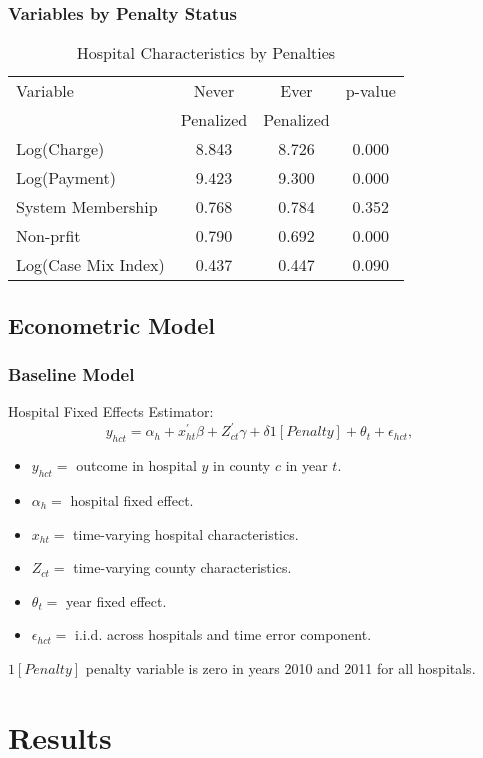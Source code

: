 \documentclass{beamer}
\begin{document}
\begin{frame}
\frametitle{Variables by Penalty Status}
\begin{table}[htp]
\centering \normalsize
\caption{Hospital Characteristics by Penalties}
\label{tab:hosp}
\begin{tabular}{lccc}
\hline \hline
Variable 	& Never 				& Ever  				& p-value  	  \\
		   		&  Penalized    		& Penalized			&       				\\
 \hline
Log(Charge) & 8.843 & 8.726 & 0.000 \\
Log(Payment) & 9.423 & 9.300 & 0.000	\\
System Membership & 0.768 & 0.784 & 0.352	\\
Non-prfit & 0.790 & 0.692 & 0.000	\\
Log(Case Mix Index) & 0.437 & 0.447 & 0.090	\\
\hline
\end{tabular}
\end{table}
\end{frame}

\subsection{Econometric Model}

\begin{frame}
\frametitle{Baseline Model}
Hospital Fixed Effects Estimator: 
\begin{equation}
\label{eq: reg}
y_{hct} = \alpha_{h} + x^{'}_{ht}\beta +  Z^{'}_{ct}\gamma+ \delta1[Penalty]  + \theta_{t}  +  \epsilon_{hct},
\end{equation}
\begin{itemize}
\item $y_{hct} =$ outcome in hospital $y$ in county $c$ in year $t$.
\item $\alpha_{h}=$ hospital fixed effect.
\item $x_{ht}=$ time-varying hospital characteristics.
\item $Z_{ct}=$ time-varying county characteristics.
\item $\theta_{t}=$ year fixed effect.
\item $\epsilon_{hct}=$ i.i.d. across hospitals and time error component.
\end{itemize}
$1[Penalty]$  penalty variable is zero in years 2010 and 2011 for all hospitals.
\end{frame}


\section{Results}
\end{document}
